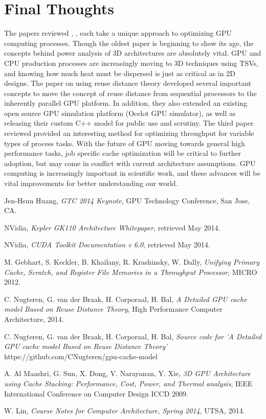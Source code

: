 \documentclass[conference]{IEEEtran}
\begin{document}
\section{Final Thoughts}
The papers reviewed \cite{throughput}, \cite{cache}, \cite{cachestacking} each
take a unique approach to optimizing GPU computing processes. Though the oldest
paper \cite{cachestacking} is beginning to show its age, the concepts behind 
power analysis of 3D architectures are absolutely vital. GPU and CPU production
processes are increasingly moving to 3D techniques using TSVs, and knowing how
much heat must be dispersed is just as critical as in 2D designs. The paper on
using reuse distance theory \cite{cache} developed several important concepts
to move the concept of reuse distance from sequential processors to the 
inherently parallel GPU platform. In addition, they also extended an existing 
open source GPU simulation platform (Ocelot GPU simulator), as well as 
releasing their custom C++ model for public use and scrutiny. The third paper 
reviewed \cite{throughput} provided an interesting method for optimizing 
throughput for variable types of process tasks. With the future of GPU 
moving towards general high performance tasks, job specific cache optimization 
will be critical to further adoption, but may come in conflict with current
architecture assumptions. GPU computing is increasingly important in scientific
work, and these advances will be vital improvements for better understanding
our world.

\begin{thebibliography}{1}
Jen-Hsun Huang, \emph{GTC 2014 Keynote}, GPU Technology Conference, San Jose, CA.

NVidia, \emph{Kepler GK110 Architecture Whitepaper}, retrieved May 2014.

NVidia, \emph{CUDA Toolkit Documentation v 6.0}, retrieved May 2014.

M. Gebhart, S. Keckler, B. Khailany, R. Krashinsky, W. Dally, 
\emph{Unifying Primary Cache, Scratch, and Register File Memories in a 
Throughput Processor}, MICRO 2012.

C. Nugteren, G. van der Braak, H. Corporaal, H. Bal, 
\emph{A Detailed GPU cache model Based on Reuse Distance Theory}, 
High Performance Computer Architecture, 2014.

C. Nugteren, G. van der Braak, H. Corporaal, H. Bal, 
\emph{Source code for 'A Detailed GPU cache model Based on Reuse Distance Theory'}
 https://github.com/CNugteren/gpu-cache-model

A. Al Maashri, G. Sun, X. Dong, V. Narayanan, Y. Xie,
\emph{3D GPU Architecture using Cache Stacking: Performance, Cost, Power, and
Thermal analysis}, IEEE International Conference on Computer Design ICCD 2009.

W. Lin, \emph{Course Notes for Computer Architecture, Spring 2014}, UTSA, 2014.
\end{thebibliography}




\end{document}
